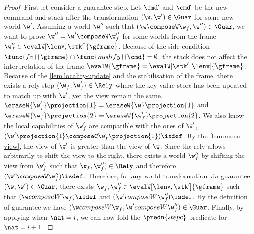 \begin{proof}
First let consider a guarantee step.
Let \( \cmd' \) and \( \cmd' \) be the new command and stack after the transformation \( (\w, \w') \in \Guar \) for some new world \( \w'\).
Assuming a world \( \w'' \) such that \( (\w \composeW \w_f, \w'') \in \Guar \), we want to prove \( \w''  = \w' \composeW \w_f'' \) for some worlds from the frame \( \w_f'' \in \evalW[\lenv, \stk']{\gframe} \).
Because of the side condition \( \func{fv}{\gframe} \cap \func{modify}{\cmd} = \emptyset \), the stack does not affect the interpretation of the frame \( \evalW{\gframe} = \evalW[\stk',\lenv]{\gframe}\).
Because of the \cref{lem:locality-update} and the stabilisation of the frame, there exists a rely step \( (\w_f, \w_{f}') \in \Rely \) where the key-value store has been updated to match up with \( \w' \), yet the view remain the same, \ie \( \eraseW{\w_{f}'}\projection{1} = \eraseW{\w}\projection{1}\) and \( \eraseW{\w_f}\projection{2} = \eraseW{\w'_{f}}\projection{2}\).
We also know the local capabilities of \( \w'_{f}\) are compatible with the ones of \( \w' \), \ie \( (\w'\projection{1} \composeC \w'_{f}\projection{1})\isdef\).
By the \cref{lem:mono-view}, the view of \( \w'\) is greater than the view of \( \w \).
Since the rely allows arbitrarily to shift the view to the right, there exists a world \( \w_f''\) by shifting the view from \( \w_f' \) such that \( \w_f, \w_f'') \in \Rely \) and therefore \( (\w' \composeW \w_f'')\isdef \).
Therefore, for any world transformation via guarantee \( (\w, \w') \in \Guar \), there exists \( \w_f, \w_f'' \in \evalW[\lenv,\stk']{\gframe}\)  such that \( (\w composeW \w_f)\isdef\) and \( (\w' composeW \w_f'')\isdef\).
By the definition of guarantee we have \( (\w composeW \w_f, \w' composeW \w''_f) \in \Guar \).
Finally, by applying \ih when \( \nat = i \), we can now fold the \( \predn{stepc} \) predicate for \( \nat = i + 1 \).


\end{proof}
